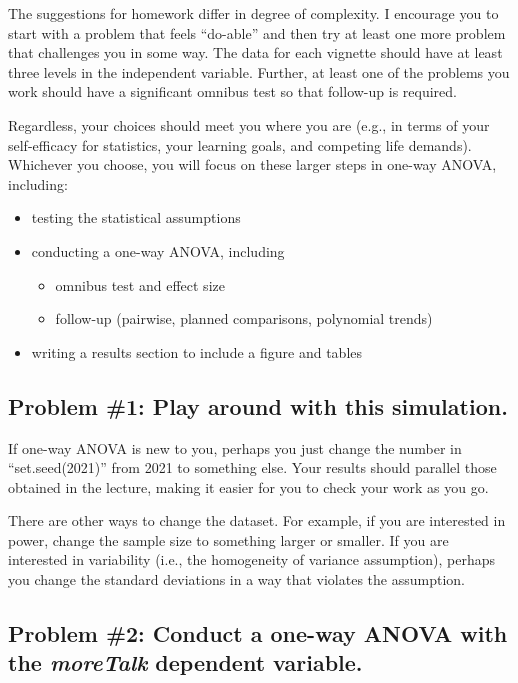 \documentclass[
  11pt,
]{book}
\providecommand{\tightlist}{%
  \setlength{\itemsep}{0pt}\setlength{\parskip}{0pt}}
\begin{document}
The suggestions for homework differ in degree of complexity. I encourage you to start with a problem that feels ``do-able'' and then try at least one more problem that challenges you in some way. The data for each vignette should have at least three levels in the independent variable. Further, at least one of the problems you work should have a significant omnibus test so that follow-up is required.

Regardless, your choices should meet you where you are (e.g., in terms of your self-efficacy for statistics, your learning goals, and competing life demands). Whichever you choose, you will focus on these larger steps in one-way ANOVA, including:

\begin{itemize}
\tightlist
\item
  testing the statistical assumptions
\item
  conducting a one-way ANOVA, including

  \begin{itemize}
  \tightlist
  \item
    omnibus test and effect size
  \item
    follow-up (pairwise, planned comparisons, polynomial trends)
  \end{itemize}
\item
  writing a results section to include a figure and tables
\end{itemize}

\hypertarget{problem-1-play-around-with-this-simulation.}{%
\subsection{Problem \#1: Play around with this simulation.}\label{problem-1-play-around-with-this-simulation.}}

If one-way ANOVA is new to you, perhaps you just change the number in ``set.seed(2021)'' from 2021 to something else. Your results should parallel those obtained in the lecture, making it easier for you to check your work as you go.

There are other ways to change the dataset. For example, if you are interested in power, change the sample size to something larger or smaller. If you are interested in variability (i.e., the homogeneity of variance assumption), perhaps you change the standard deviations in a way that violates the assumption.

\hypertarget{problem-2-conduct-a-one-way-anova-with-the-moretalk-dependent-variable.}{%
\subsection{\texorpdfstring{Problem \#2: Conduct a one-way ANOVA with the \emph{moreTalk} dependent variable.}{Problem \#2: Conduct a one-way ANOVA with the moreTalk dependent variable.}}\label{problem-2-conduct-a-one-way-anova-with-the-moretalk-dependent-variable.}}
\end{document}
